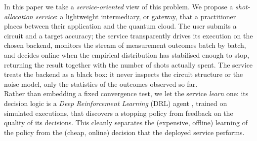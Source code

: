 \documentclass[runningheads]{llncs}
\begin{document}
In this paper we take a \emph{service-oriented} view of this problem. We propose a
\emph{shot-allocation service}: a lightweight intermediary, or gateway, that a
practitioner places between their application and the quantum cloud. The user
submits a circuit and a target accuracy; the service transparently drives its
execution on the chosen backend, monitors the stream of measurement outcomes
batch by batch, and decides online when the empirical distribution has stabilised
enough to stop, returning the result together with the number of shots actually
spent. The service treats the backend as a black box: it never inspects the
circuit structure or the noise model, only the statistics of the outcomes
observed so far.\\
Rather than embedding a fixed convergence test, we let the service
\emph{learn} one: its decision logic is a \emph{Deep Reinforcement Learning}
(DRL) agent \cite{watkins1992qlearning}, trained on simulated executions, that discovers a stopping policy
from feedback on the quality of its decisions. This cleanly separates the
(expensive, offline) learning of the policy from the (cheap, online) decision that the deployed service performs.
\end{document}
